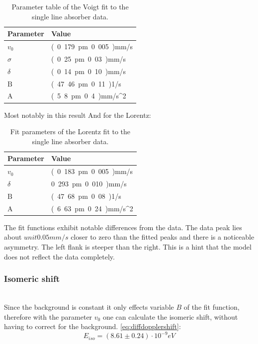 \begin{table}[H]\centering
	\begin{tabular}{@{}ll@{}}
		\toprule
		Parameter&Value \\
		\midrule
		$v_0$ & \unit{(0.179\pm0.005)}{mm/s} \\
		$\sigma$ & \unit{( 0.25\pm0.03)}{mm/s} \\
		$\delta$  & \unit{(0.14\pm0.10)}{mm/s} \\
		$\text{B}$ & \unit{(47.46\pm0.11)}{1/s}  \\
		A & \unit{(5.8\pm0.4)}{mm/s^2}\\
		\bottomrule
	\end{tabular}
	\caption[Voigt fit result]{Parameter table of the Voigt fit to the single line absorber data.}
	\label{tb:analysis:Voigtfit}
\end{table}
Most notably in this result
And for the Lorentz:
\begin{table}[H]\centering
	\begin{tabular}{@{}ll@{}}
		\toprule
		Parameter&Value \\
		\midrule
		$v_0$ & \unit{(0.183\pm0.005)}{mm/s} \\
		$\delta$  & \unit{0.293\pm0.010)}{mm/s} \\
		$\text{B}$ & \unit{(47.68\pm0.08)}{1/s}  \\
		A & \unit{(6.63\pm0.24)}{mm/s^2}\\
		\bottomrule
	\end{tabular}
	\caption[Lorentz fit result]{Fit parameters of the Lorentz fit to the single line absorber data.}
	\label{tb:analysis:Lorentzfit}
\end{table}

The fit functions exhibit notable differences from the data. The data peak lies about $unit{0.05}{mm/s}$ closer to zero than the fitted peaks and there is a noticeable asymmetry. The left flank is steeper than the right. This is a hint that the model does not reflect the data completely.
\subsubsection{Isomeric shift} \ \\
Since the background is constant it only effects variable $B$ of the fit function, therefore
with the parameter $v_0$ one can calculate the isomeric shift, without having to correct for the background. \ref{eq:diffdopplershift}:
\begin{equation}
E_{iso} = (8.61\pm0.24)\cdot 10^{-9} eV
\end{equation}
